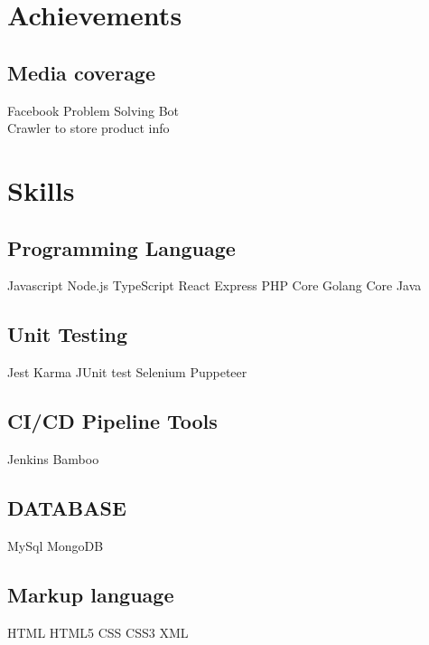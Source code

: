 \documentclass[]{deedy-resume-openfont}
\begin{document}
\begin{minipage}[t]{0.33\textwidth}

\section{Achievements}
\subsection{Media coverage}
\textbullet{} Facebook Problem Solving Bot
\\
\vspace{\topsep}
\textbullet{} Crawler to store product info
\\
\sectionsep


\section{Skills}
\subsection{Programming Language}
Javascript \textbullet{} Node.js \textbullet{} TypeScript \textbullet{} React \textbullet{} Express \textbullet{} PHP \textbullet{} Core Golang \textbullet{} Core Java
\sectionsep
\subsection{Unit Testing}
Jest \textbullet{}   Karma \textbullet{} JUnit test \textbullet{} Selenium \textbullet{} Puppeteer
\sectionsep
\subsection{CI/CD Pipeline Tools}
Jenkins \textbullet{}   Bamboo
\sectionsep
\subsection{DATABASE}
MySql \textbullet{} MongoDB
\sectionsep
\subsection{Markup language}
HTML \textbullet{} HTML5 \textbullet{} CSS \textbullet{} CSS3 \textbullet{} XML
\sectionsep

\end{minipage}
\end{document}
